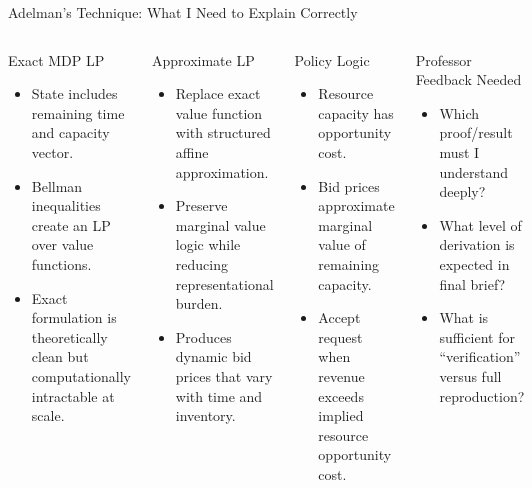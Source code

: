 \documentclass[aspectratio=169,11pt]{beamer}
\begin{document}
\begin{frame}[t]{Adelman's Technique: What I Need to Explain Correctly}
\small
\begin{columns}[T,onlytextwidth]
\begin{block}{Exact MDP LP}
\begin{itemize}
    \item State includes remaining time and capacity vector.
    \item Bellman inequalities create an LP over value functions.
    \item Exact formulation is theoretically clean but computationally intractable at scale.
\end{itemize}
\end{block}

\begin{block}{Approximate LP}
\begin{itemize}
    \item Replace exact value function with structured affine approximation.
    \item Preserve marginal value logic while reducing representational burden.
    \item Produces dynamic bid prices that vary with time and inventory.
\end{itemize}
\end{block}

\begin{block}{Policy Logic}
\begin{itemize}
    \item Resource capacity has opportunity cost.
    \item Bid prices approximate marginal value of remaining capacity.
    \item Accept request when revenue exceeds implied resource opportunity cost.
\end{itemize}
\end{block}

\begin{block}{Professor Feedback Needed}
\begin{itemize}
    \item Which proof/result must I understand deeply?
    \item What level of derivation is expected in final brief?
    \item What is sufficient for ``verification'' versus full reproduction?
\end{itemize}
\end{block}
\end{columns}
\end{frame}
\end{document}
